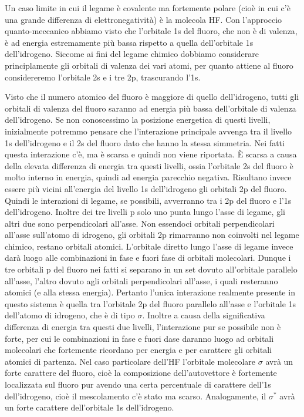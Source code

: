 Un caso limite in cui il legame è covalente ma fortemente polare (cioè in cui c'è una grande differenza di elettronegatività) è la molecola HF. Con l'approccio quanto-meccanico abbiamo visto che l'orbitale 1s del fluoro, che non è di valenza, è ad energia estremamente più bassa rispetto a quella dell'orbitale 1s dell'idrogeno. Siccome ai fini del legame chimico dobbiamo considerare principlamente gli orbitali di valenza dei vari atomi, per quanto attiene al fluoro considereremo l'orbitale 2s e i tre 2p, trascurando l'1s.

Visto che il numero atomico del fluoro è maggiore di quello dell'idrogeno, tutti gli orbitali di valenza del fluoro saranno ad energia più bassa dell'orbitale di valenza dell'idrogeno. Se non conoscessimo la posizione energetica di questi livelli, inizialmente potremmo pensare che l'interazione principale avvenga tra il livello 1s dell'idrogeno e il 2s del fluoro dato che hanno la stessa simmetria. Nei fatti questa interazione c'è, ma è scarsa e quindi non viene riportata. È scarsa a causa della elevata differenza di energia tra questi livelli, ossia l'orbitale 2s del fluoro è molto interno in energia, quindi ad energia parecchio negativa. Risultano invece essere più vicini all'energia del livello 1s dell'idrogeno gli orbitali 2p del fluoro. Quindi le interazioni di legame, se possibili, avverranno tra i 2p del fluoro e l'1s dell'idrogeno. Inoltre dei tre livelli p solo uno punta lungo l'asse di legame, gli altri due sono perpendicolari all'asse. Non essendoci orbitali perpendicolari all'asse sull'atomo di idrogeno, gli orbitali 2p rimarranno non coinvolti nel legame chimico, restano orbitali atomici. L'orbitale diretto lungo l'asse di legame invece darà luogo alle combinazioni in fase e fuori fase di orbitali molecolari. Dunque i tre orbitali p del fluoro nei fatti si separano in un set dovuto all'orbitale parallelo all'asse, l'altro dovuto agli orbitali perpendicolari all'asse, i quali resteranno atomici (e alla stessa energia). Pertanto l'unica interazione realmente presente in questo sistema è quella tra l'orbitale 2p del fluoro parallelo all'asse e l'orbitale 1s dell'atomo di idrogeno, che è di tipo $\sigma$. Inoltre a causa della significativa differenza di energia tra questi due livelli, l'interazione pur se possibile non è forte, per cui le combinazioni in fase e fuori dase daranno luogo ad orbitali molecolari che fortemente ricordano per energia e per carattere gli orbitali atomici di partenza. Nel caso particolare dell'HF l'orbitale molecolare $\sigma$ avrà un forte carattere del fluoro, cioè la composizione dell'autovettore è fortemente localizzata sul fluoro pur avendo una certa percentuale di carattere dell'1s dell'idrogeno, cioè il mescolamento c'è stato ma scarso. Analogamente, il $\sigma^*$ avrà un forte carattere dell'orbitale 1s dell'idrogeno.


